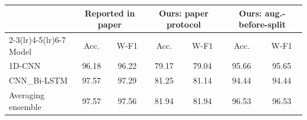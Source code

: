 \begin{tabular}{lcccccc}
\toprule
 & \multicolumn{2}{c}{Reported in paper} & \multicolumn{2}{c}{Ours: paper protocol} & \multicolumn{2}{c}{Ours: aug.-before-split} \\
\cmidrule(lr){2-3}\cmidrule(lr){4-5}\cmidrule(lr){6-7}
Model & Acc. & W-F1 & Acc. & W-F1 & Acc. & W-F1 \\
\midrule
1D-CNN & 96.18 & 96.22 & 79.17 & 79.04 & 95.66 & 95.65 \\
CNN\_Bi-LSTM & 97.57 & 97.29 & 81.25 & 81.14 & 94.44 & 94.44 \\
Averaging ensemble & 97.57 & 97.56 & 81.94 & 81.94 & 96.53 & 96.53 \\
\bottomrule
\end{tabular}
